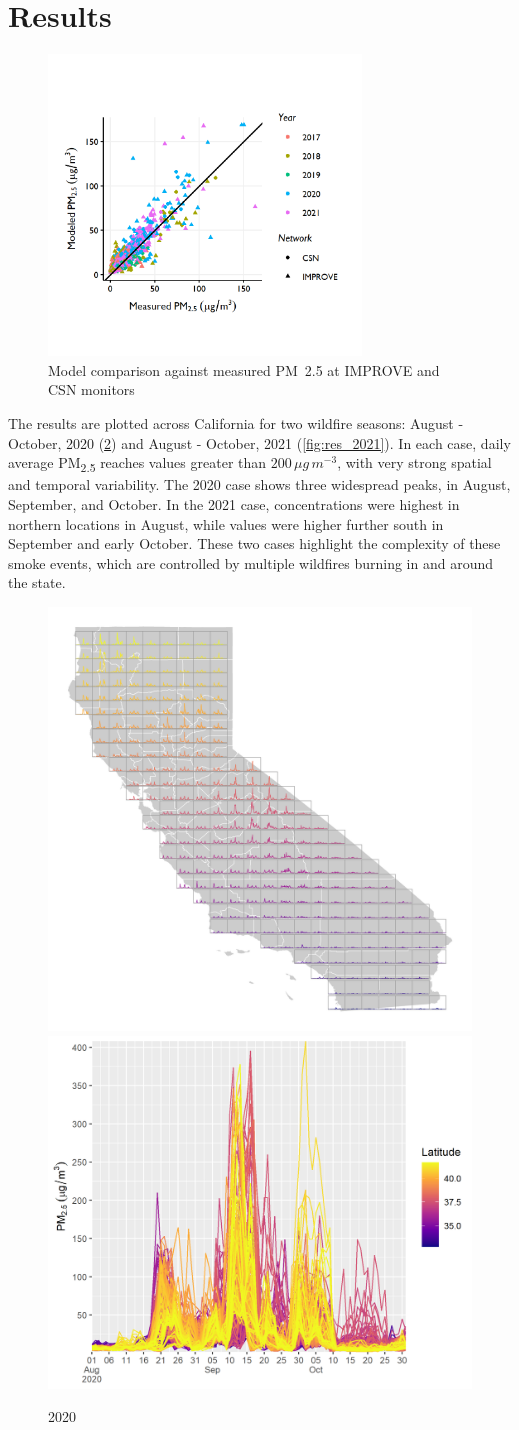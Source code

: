 \documentclass[gmd, manuscript]{copernicus}
\begin{document}
\section{Results}

\begin{figure}
\includegraphics[width=8.3cm]{./Figures/Model_vs_Filters_FiveEpisodesGMD} \caption{Model comparison against measured PM~2.5 at IMPROVE and CSN monitors}\label{fig:filters}
\end{figure}

The results are plotted across California for two wildfire seasons:
August - October, 2020 (\ref{fig:res_2020}) and August - October, 2021
(\ref{fig:res_2021}). In each case, daily average PM\textsubscript{2.5}
reaches values greater than \(200\,\unit{\mu g\,m^{-3}}\), with very
strong spatial and temporal variability. The 2020 case shows three
widespread peaks, in August, September, and October. In the 2021 case,
concentrations were highest in northern locations in August, while
values were higher further south in September and early October. These
two cases highlight the complexity of these smoke events, which are
controlled by multiple wildfires burning in and around the state.

\begin{figure}
\includegraphics[width=0.4\linewidth]{./Figures/Sparkmap2020} \includegraphics[width=0.4\linewidth]{./Figures/SparkLegend2020} \caption{2020}\label{fig:res_2020}
\end{figure}
\end{document}
